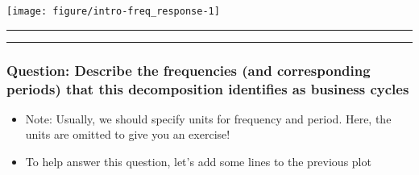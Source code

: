 \documentclass[]{article}
\newenvironment{Shaded}{\begin{snugshade}}{\end{snugshade}}
\newcommand{\KeywordTok}[1]{\textcolor[rgb]{0.13,0.29,0.53}{\textbf{#1}}}
\newcommand{\DataTypeTok}[1]{\textcolor[rgb]{0.13,0.29,0.53}{#1}}
\newcommand{\DecValTok}[1]{\textcolor[rgb]{0.00,0.00,0.81}{#1}}
\newcommand{\FloatTok}[1]{\textcolor[rgb]{0.00,0.00,0.81}{#1}}
\newcommand{\StringTok}[1]{\textcolor[rgb]{0.31,0.60,0.02}{#1}}
\newcommand{\OtherTok}[1]{\textcolor[rgb]{0.56,0.35,0.01}{#1}}
\newcommand{\OperatorTok}[1]{\textcolor[rgb]{0.81,0.36,0.00}{\textbf{#1}}}
\newcommand{\NormalTok}[1]{#1}
\begin{document}
\begin{Shaded}
\end{Shaded}

\begin{center}\texttt{[image: figure/intro-freq\_response-1]} \end{center}

\begin{center}\rule{0.5\linewidth}{\linethickness}\end{center}

\begin{center}\rule{0.5\linewidth}{\linethickness}\end{center}

\subsubsection{Question: Describe the frequencies (and corresponding
periods) that this decomposition identifies as business
cycles}\label{question-describe-the-frequencies-and-corresponding-periods-that-this-decomposition-identifies-as-business-cycles}

\begin{itemize}
\item
  Note: Usually, we should specify units for frequency and period. Here,
  the units are omitted to give you an exercise!
\item
  To help answer this question, let's add some lines to the previous
  plot
\end{itemize}
\end{document}
